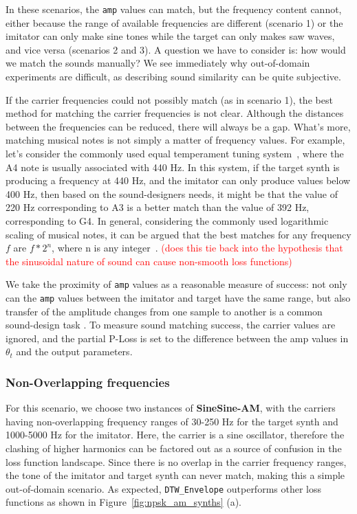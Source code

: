 \documentclass[runningheads]{llncs}
\newcommand{\todo}[1]{\textcolor{red}{#1}}
\newcommand{\DTWEnv}{\texttt{DTW\_Envelope}\xspace}
\newcommand{\FMModvtwo}{\textbf{SineSine-AM}\xspace}
\begin{document}
In these scenarios, the \texttt{amp} values can match, but the frequency content cannot, either because the range of available frequencies are different (scenario 1) or the imitator can only make sine tones while the target can only makes saw waves, and vice versa (scenarios 2 and 3). A question we have to consider is: how would we match the sounds manually? We see immediately why out-of-domain experiments are difficult, as describing sound similarity can be quite subjective.

If the carrier frequencies could not possibly match (as in scenario 1), the best method for matching the carrier frequencies is not clear. Although the distances between the frequencies can be reduced, there will always be a gap. What's more, matching musical notes is not simply a matter of frequency values. For example, let's consider the commonly used equal temperament tuning system~\cite{sethares2005tuning}, where the A4 note is usually associated with 440 Hz. In this system, if the target synth is producing a frequency at 440 Hz, and the imitator can only produce values below 400 Hz, then based on the sound-designers needs, it might be that the value of 220 Hz corresponding to A3 is a better match than the value of 392 Hz, corresponding to G4. In general, considering the commonly used logarithmic scaling of musical notes, it can be argued that the best matches for any frequency $f$ are $f*2^{n}$, where n is any integer~\cite{young1939terminology}. \todo{(does this tie back into the hypothesis that the sinusoidal nature of sound can cause non-smooth loss functions)}

We take the proximity of \texttt{amp} values as a reasonable measure of success: not only can the \texttt{amp} values between the imitator and target have the same range, but also transfer of the amplitude changes from one sample to another is a common sound-design task \cite{engel2020ddsp}. To measure sound matching success, the carrier values are ignored, and the partial P-Loss is set to the difference between the amp values in $\theta_t$ and the output parameters.

\subsubsection{Non-Overlapping frequencies}
\label{sec:am_sound_matching_nonoverlapping}
For this scenario, we choose two instances of \FMModvtwo, with the carriers having non-overlapping frequency ranges of 30-250 Hz for the target synth and 1000-5000 Hz for the imitator. Here, the carrier is a sine oscillator, therefore the clashing of higher harmonics can be factored out as a source of confusion in the loss function landscape. Since there is no overlap in the carrier frequency ranges, the tone of the imitator and target synth can never match, making this a simple out-of-domain scenario. As expected, \DTWEnv outperforms other loss functions as shown in Figure~\ref{fig:npsk_am_synths} (a).
\end{document}
